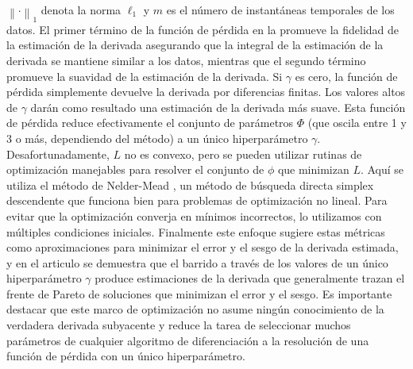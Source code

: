 $\left\lVert{\cdot}\right\rVert _{1}$  denota la norma $\ell_1$ y $m$ es el número de instantáneas temporales de los datos.  El primer término de la función de pérdida en la promueve la fidelidad de la estimación de la derivada asegurando que la integral de la estimación de la derivada se mantiene similar a los datos, mientras que el segundo término promueve la suavidad de la estimación de la derivada. Si $\gamma$ es cero, la función de pérdida simplemente devuelve la derivada por diferencias finitas. Los valores altos de $\gamma$ darán como resultado una estimación de la derivada más suave.  Esta función de pérdida reduce efectivamente el conjunto de parámetros $\Phi$ (que oscila entre 1 y 3 o más, dependiendo del método) a un único hiperparámetro $\gamma$. Desafortunadamente, $L$ no es convexo, pero se pueden utilizar rutinas de optimización manejables para resolver el conjunto de $\phi$ que minimizan $L$. Aquí se utiliza el método de Nelder-Mead \cite{nelder_simplex_1965}, un método de búsqueda directa simplex descendente que funciona bien para problemas de optimización no lineal. Para evitar que la optimización converja en mínimos incorrectos, lo utilizamos con múltiples condiciones iniciales. Finalmente este enfoque sugiere estas métricas como aproximaciones para minimizar el error y el sesgo de la derivada estimada, y en el articulo \cite{van_breugel_numerical_2020}  se demuestra que el barrido a través de los valores de un único hiperparámetro $\gamma$ produce estimaciones de la derivada que generalmente trazan el frente de Pareto de soluciones que minimizan el error y el sesgo.  Es importante destacar que este marco de optimización no asume ningún conocimiento de la verdadera derivada subyacente y reduce la tarea de seleccionar muchos parámetros de cualquier algoritmo de diferenciación a la resolución de una función de pérdida con un único hiperparámetro. 





